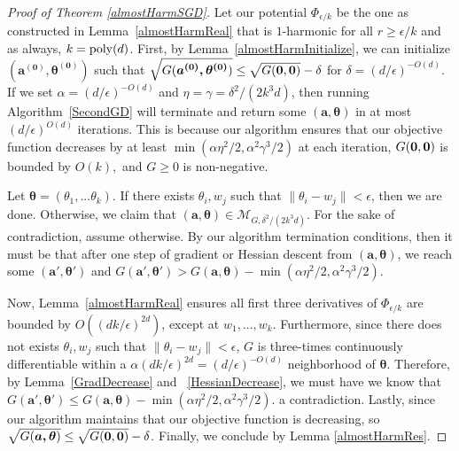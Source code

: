 \begin{proof}[Proof of Theorem \ref{almostHarmSGD}]
  Let our potential $\Phi_{\epsilon/k}$ be the one as constructed in Lemma~\ref{almostHarmReal} that is $1$-harmonic for all $r \geq \epsilon/k$ and as always, $k = \mathrm{poly}(d)$.  First, by Lemma~\ref{almostHarmInitialize}, we can initialize $\boldsymbol{(a^{(0)},\theta^{(0)})}$ such that $\sqrt{G(\boldsymbol{a^{(0)},\theta^{(0)}})} \leq \sqrt{G({\bf 0,0})} - \delta$ for $\delta = (d/\epsilon)^{-O(d)}$. If we set $\alpha = (d/\epsilon)^{-O(d)}$ and $\eta = \gamma = \delta^2/(2k^3d)$, then running Algorithm~\ref{SecondGD} will terminate and return some $(\boldsymbol{a,\theta})$ in at most $(d/\epsilon)^{O(d)}$ iterations. This is because our algorithm ensures that our objective function decreases by at least $\min(\alpha \eta^2/2, \alpha^2\gamma^3/2)$ at each iteration, $G({\bf 0, 0})$ is bounded by $O(k),$ and $G \geq 0$ is non-negative.

Let $\boldsymbol{\theta} = (\theta_1,...\theta_k)$. If there exists $\theta_i, w_j$ such that $\|\theta_i - w_j\| < \epsilon$, then we are done. Otherwise, we claim that $(\boldsymbol{a,\theta}) \in \mathcal{M}_{G, \delta^2/(2k^3d)}$. For the sake of contradiction, assume otherwise. By our algorithm termination conditions, then it must be that after one step of gradient or Hessian descent from $(\boldsymbol{a,\theta})$, we reach some $(\boldsymbol{a',\theta'})$ and $G(\boldsymbol{a',\theta'}) > G(\boldsymbol{a,\theta}) - \min(\alpha\eta^2/2,\alpha^2\gamma^3/2)$.

Now, Lemma~\ref{almostHarmReal} ensures all first three derivatives of $\Phi_{\epsilon/k}$ are bounded by $O((dk/\epsilon)^{2d})$, except at $w_1,...,w_k$. Furthermore, since there does not exists $\theta_i, w_j$ such that $\|\theta_i - w_j\| <\epsilon$, $G$ is three-times continuously differentiable within a $\alpha (dk/\epsilon)^{2d} = (d/\epsilon)^{-O(d)}$ neighborhood of $\boldsymbol{\theta}$. Therefore, by Lemma~\ref{GradDecrease} and ~\ref{HessianDecrease}, we must have  we know that $G(\boldsymbol{a',\theta'}) \leq G(\boldsymbol{a,\theta}) - \min(\alpha\eta^2/2,\alpha^2\gamma^3/2)$. a contradiction. Lastly, since our algorithm maintains that our objective function is decreasing, so $\sqrt{G(\boldsymbol{a,\theta})} \leq \sqrt{G({\bf 0,0})} - \delta$. Finally, we conclude by Lemma \ref{almostHarmRes}.
\end{proof}


